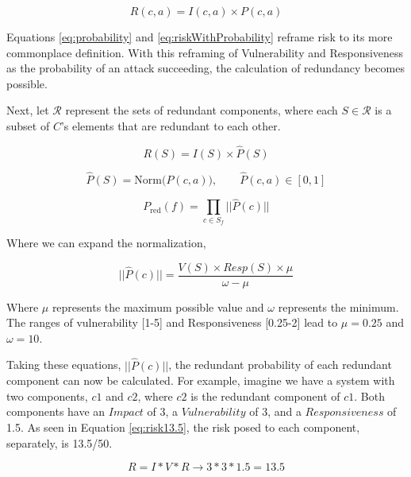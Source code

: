 \begin{equation}
    \label{eq:riskWithProbability}
    R(c,a) = I(c,a) \times P(c,a)
\end{equation}

Equations \ref{eq:probability} and \ref{eq:riskWithProbability} reframe risk to its more commonplace definition.
With this reframing of Vulnerability and Responsiveness as the probability of an attack succeeding, the calculation of redundancy becomes possible.

Next, let $\mathcal{R}$ represent the sets of redundant components, where each $S \in \mathcal{R}$ is a subset of $ C$'s elements that are redundant to each other.

\begin{equation}
    \label{eq:componentRisk}
    R(S) = I(S) \times \widehat{P}(S)
\end{equation}

\begin{equation}
    \label{eq:normProbability}
    \widehat{P}(S) = \mathrm{Norm}\bigl(P(c,a)\bigr), \qquad \widehat{P}(c,a) \in [0,1]
\end{equation}


\begin{equation}
    \label{eq:probabilityRedundantSet}
    P_{\text{red}}(f) = \prod_{c \in S_f} ||\widehat{P}(c)||
\end{equation}

Where we can expand the normalization,


\begin{equation}
    \label{eq:probabilityRedundantSet}
    ||\widehat{P}(c)|| = \frac{V(S) \times Resp(S) \times \mu}{\omega - \mu}
\end{equation}

Where $\mu$ represents the maximum possible value and $\omega$ represents the minimum. The ranges of vulnerability [1-5] and Responsiveness [0.25-2] lead to $\mu=0.25$ and $\omega=10$. 

Taking these equations, $||\widehat{P}(c)||$, the redundant probability of each redundant component can now be calculated. For example, imagine we have a system with two components, $c1$ and $c2$, where $c2$ is the redundant component of $c1$. Both components have an $Impact$ of 3, a $Vulnerability$ of 3, and a $Responsiveness$ of 1.5. As seen in Equation \ref{eq:risk13.5}, the risk posed to each component, separately, is 13.5/50.

\begin{equation}
    \label{eq:risk13.5}
    R = I*V*R \rightarrow 3*3*1.5 = 13.5
\end{equation}

